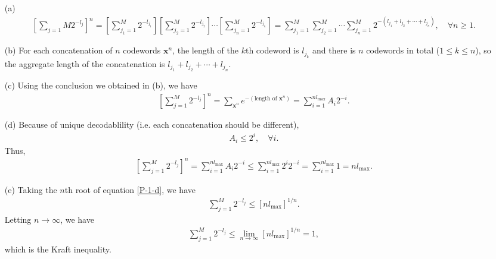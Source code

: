 \documentclass{assignment}
\begin{document}
\begin{pf}
    \begin{itemize}
        \item[(a)] 
        \begin{align}
            \left[\sum_{j=1}M2^{-l_j}\right]^n=\left[\sum_{j_1=1}^M2^{-l_{j_1}}\right]\left[\sum_{j_2=1}^M2^{-l_{j_2}}\right]\cdots\left[\sum_{j_n=1}^M2^{-l_{j_n}}\right]=\sum_{j_1=1}^M\sum_{j_2=1}^M\cdots\sum_{j_n=1}^M2^{-(l_{j_1}+l_{j_2}+\cdots+l_{j_n})},\quad\forall n\geq 1.
        \end{align}
        \item[(b)] For each concatenation of $n$ codewords $\bm{x}^n$, the length of the $k$th codeword is $l_{j_k}$ and there is $n$ codewords in total ($1\leq k\leq n$), so the aggregate length of the concatenation is $l_{j_1}+l_{j_2}+\cdots+l_{j_n}$.
        \item[(c)] Using the conclusion we obtained in (b), we have
        \begin{align}
            \left[\sum_{j=1}^M2^{-l_j}\right]^n=\sum_{\bm{x}^n}e^{-(\text{length of }\bm{x}^n)}=\sum_{i=1}^{nl_{\max}}A_i2^{-i}.
        \end{align}
        \item[(d)] Because of unique decodablility (i.e. each concatenation should be different),
        \begin{align}
            A_i\leq 2^i,\quad\forall i.
        \end{align}
        Thus,
        \begin{align}
            \label{P-1-d}
            \left[\sum_{j=1}^M2^{-l_j}\right]^n=\sum_{i=1}^{nl_{\max}}A_i2^{-i}\leq\sum_{i=1}^{nl_{\max}}2^i2^{-i}=\sum_{i=1}^{nl_{\max}}1=nl_{\max}.
        \end{align}
        \item[(e)] Taking the $n$th root of equation \eqref{P-1-d}, we have
        \begin{align}
            \sum_{j=1}^M2^{-l_j}\leq[nl_{\max}]^{1/n}.
        \end{align}
        Letting $n\rightarrow\infty$, we have
        \begin{align}
            \sum_{j=1}^M2^{-l_j}\leq\lim_{n\rightarrow\infty}[nl_{\max}]^{1/n}=1,
        \end{align}
        which is the Kraft inequality.
    \end{itemize}
\end{pf}
\end{document}
